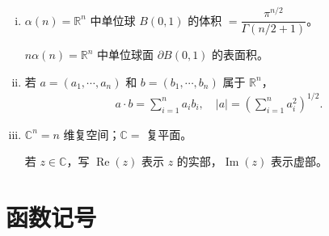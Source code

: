 \documentclass[../main.tex]{subfiles}
\begin{document}
\begin{enumerate}[(i)]
\item $\alpha(n)=\mathbb{R}^n$ 中单位球 $B(0,1)$ 的体积 $=\dfrac{\pi^{n/2}}{\Gamma(n/2+1)}$。

$n\alpha(n)=\mathbb{R}^n$ 中单位球面 $\partial B(0,1)$ 的表面积。

\item 若 $a=(a_1,\cdots,a_n)$ 和 $b=(b_1,\cdots,b_n)$ 属于 $\mathbb{R}^n$，
\begin{align*}
a\cdot b=\sum_{i=1}^n a_ib_i,\quad|a|=\left(\sum_{i=1}^n a_i^2\right)^{1/2}.
\end{align*}

\item $\mathbb{C}^n=n$ 维复空间；$\mathbb{C}=$ 复平面。

若 $z\in\mathbb{C}$，写 $\operatorname{Re}(z)$ 表示 $z$ 的实部，$\operatorname{Im}(z)$ 表示虚部。
\end{enumerate}

\section{函数记号}\label{section:appA-函数记号}
\end{document}
